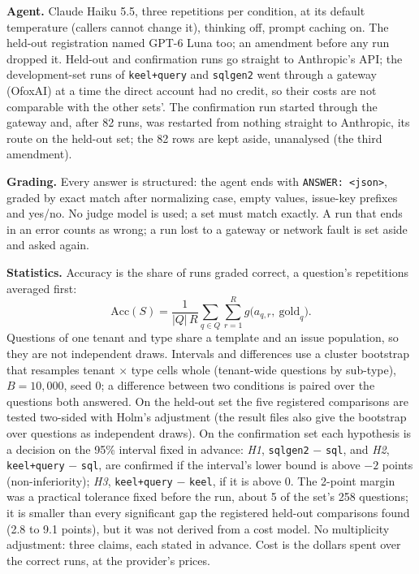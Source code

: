 \documentclass[sigconf, nonacm]{acmart}
\newcommand{\code}[1]{\texttt{#1}}
\begin{document}
\textbf{Agent.} Claude Haiku 5.5, three repetitions per condition, at its default temperature (callers cannot change it), thinking off, prompt caching on. The held-out registration named GPT-6 Luna too; an amendment before any run dropped it. Held-out and confirmation runs go straight to Anthropic's API; the development-set runs of \code{keel+query} and \code{sqlgen2} went through a gateway (OfoxAI) at a time the direct account had no credit, so their costs are not comparable with the other sets'. The confirmation run started through the gateway and, after 82 runs, was restarted from nothing straight to Anthropic, its route on the held-out set; the 82 rows are kept aside, unanalysed (the third amendment).

\textbf{Grading.} Every answer is structured: the agent ends with \code{ANSWER: <json>}, graded by exact match after normalizing case, empty values, issue-key prefixes and yes/no. No judge model is used; a set must match exactly. A run that ends in an error counts as wrong; a run lost to a gateway or network fault is set aside and asked again.

\textbf{Statistics.} Accuracy is the share of runs graded correct, a question's repetitions averaged first:
\begin{equation*}
\mathrm{Acc}(S) = \frac{1}{|Q|\,R} \sum_{q \in Q} \sum_{r=1}^{R} g\big(a_{q,r},\ \mathrm{gold}_q\big).
\end{equation*}
Questions of one tenant and type share a template and an issue population, so they are not independent draws. Intervals and differences use a cluster bootstrap that resamples tenant $\times$ type cells whole (tenant-wide questions by sub-type), $B = 10{,}000$, seed 0; a difference between two conditions is paired over the questions both answered. On the held-out set the five registered comparisons are tested two-sided with Holm's adjustment (the result files also give the bootstrap over questions as independent draws). On the confirmation set each hypothesis is a decision on the 95\% interval fixed in advance: \emph{H1}, \code{sqlgen2} $-$ \code{sql}, and \emph{H2}, \code{keel+query} $-$ \code{sql}, are confirmed if the interval's lower bound is above $-2$ points (non-inferiority); \emph{H3}, \code{keel+query} $-$ \code{keel}, if it is above 0. The 2-point margin was a practical tolerance fixed before the run, about 5 of the set's 258 questions; it is smaller than every significant gap the registered held-out comparisons found (2.8 to 9.1 points), but it was not derived from a cost model. No multiplicity adjustment: three claims, each stated in advance. Cost is the dollars spent over the correct runs, at the provider's prices.
\end{document}
